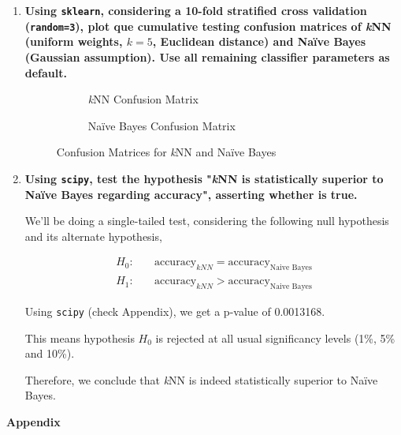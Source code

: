 \documentclass[12pt]{article}
\begin{document}
\begin{enumerate}[leftmargin=\labelsep,resume]
    \item {\bfseries
          Using \texttt{sklearn}, considering a 10-fold stratified cross validation
          (\texttt{random=3}), plot que cumulative testing confusion matrices of
          \textit{k}NN (uniform weights, $k = 5$, Euclidean distance) and Naïve Bayes
          (Gaussian assumption). Use all remaining classifier parameters as default.
          }

          \begin{figure}[H]
              \centering
              \begin{subfigure}{0.49\textwidth}
                  \centering
                  
                  \caption{\textit{k}NN Confusion Matrix}
                  \label{fig:confusion-knn}
              \end{subfigure}
              \begin{subfigure}{0.49\textwidth}
                  \centering
                  
                  \caption{Naïve Bayes Confusion Matrix}
                  \label{fig:confusion-naive-bayes}
              \end{subfigure}
              \caption{Confusion Matrices for \textit{k}NN and Naïve Bayes}
              \label{fig:confusion-matrices}
          \end{figure}

    \item {\bfseries
          Using \texttt{scipy}, test the hypothesis "\textit{k}NN is statistically
          superior to Naïve Bayes regarding accuracy", asserting whether is true.
          }

          We'll be doing a single-tailed test, considering the following null
          hypothesis and its alternate hypothesis,

          $$
              \begin{aligned}
                  H_0: & \quad\text{accuracy}_{kNN} = \text{accuracy}_{\text{Naive Bayes}} \\
                  H_1: & \quad\text{accuracy}_{kNN} > \text{accuracy}_{\text{Naive Bayes}}
              \end{aligned}
          $$

          Using \texttt{scipy} (check Appendix), we get a p-value of 0.0013168.

          This means hypothesis $H_0$ is rejected at all usual significancy levels
          (1\%, 5\% and 10\%).

          Therefore, we conclude that \textit{k}NN is indeed statistically superior
          to Naïve Bayes.
\end{enumerate}

\center\large{\textbf{Appendix}\vskip 0.3cm}
\end{document}
